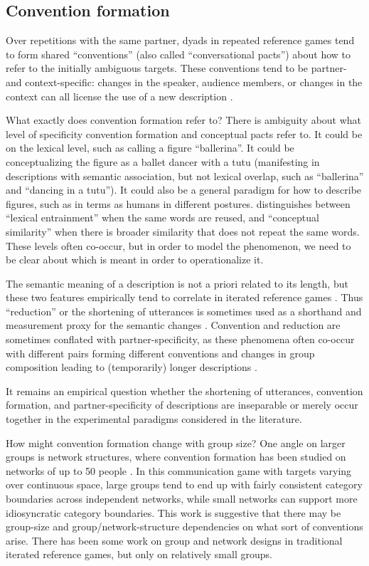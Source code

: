 \documentclass[]{article}
\begin{document}
\subsection{Convention formation}
Over repetitions with the same partner, dyads in repeated reference games tend to form shared ``conventions'' (also called ``conversational pacts'') about how to refer to the initially ambiguous targets. These conventions tend to be partner- and context-specific: changes in the speaker, audience members, or changes in the context can all license the use of a new description \citep{metzing2003a, ibarra2016, yoon2014}.

What exactly does convention formation refer to? There is ambiguity about what level of specificity convention formation and conceptual pacts refer to. It could be on the lexical level, such as calling a figure ``ballerina''. It could be conceptualizing the figure as a ballet dancer with a tutu (manifesting in descriptions with semantic association, but not lexical overlap, such as ``ballerina'' and ``dancing in a tutu''). It could also be a general paradigm for how to describe figures, such as in terms as humans in different postures.  \citet{horton2002a} distinguishes between ``lexical entrainment'' when the same words are reused, and ``conceptual similarity'' when there is broader similarity that does not repeat the same words. These levels often co-occur, but in order to model the phenomenon, we need to be clear about which is meant in order to operationalize it.  

The semantic meaning of a description is not a priori related to its length, but these two features empirically tend to correlate in iterated reference games \citep{hawkins2020b}.  Thus ``reduction'' or the shortening of utterances is sometimes used as a shorthand and measurement proxy for the semantic changes \citep{clark1986, hawkins2021}. Convention and reduction are sometimes conflated with partner-specificity, as these phenomena often co-occur with different pairs forming different conventions and changes in group composition leading to (temporarily) longer descriptions \citet{clark1986, wilkes-gibbs1992}. 

It remains an empirical question whether the shortening of utterances, convention formation, and partner-specificity of descriptions are inseparable or merely occur together in the experimental paradigms considered in the literature. 

How might convention formation change with group size? One angle on larger groups is network structures, where convention formation has been studied on networks of up to 50 people \citep{guilbeault2021}. In this communication game with targets varying over continuous space, large groups tend to end up with fairly consistent category boundaries across independent networks, while small networks can support more idiosyncratic category boundaries. This work is suggestive that there may be group-size and group/network-structure dependencies on what sort of conventions arise. There has been some work on group and network designs in traditional iterated reference games, but only on relatively small groups. 
\end{document}
